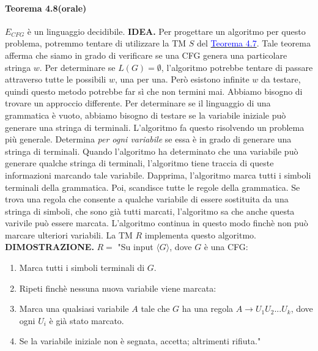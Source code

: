 \documentclass{article}
\begin{document}
\paragraph{Teorema 4.8(orale)}
\label{teorema-4.8}
$E_{CFG}$ è un linguaggio decidibile.
\vspace{1em}
\text{}
\newline
\hbox{\textbf{IDEA.}}
Per progettare un algoritmo per questo problema, potremmo tentare di utilizzare la TM $S$ del \hyperref[teorema-4.7]{\textcolor{blue}{Teorema 4.7}}.
Tale teorema afferma che siamo in grado di verificare se una CFG genera una particolare stringa $w$.
Per determinare se $L(G) = \emptyset$, l'algoritmo potrebbe tentare di passare attraverso tutte le possibili $w$, una per una.
Però esistono infinite $w$ da testare, quindi questo metodo potrebbe far sì che non termini mai.
Abbiamo bisogno di trovare un approccio differente. Per determinare se il linguaggio di una grammatica è vuoto, abbiamo bisogno di testare se la variabile iniziale può generare una stringa di terminali.
L'algoritmo fa questo risolvendo un problema più generale.
Determina \textit{per ogni variabile} se essa è in grado di generare una stringa di terminali.
Quando l'algoritmo ha determinato che una variabile può generare qualche stringa di terminali, l'algoritmo tiene traccia di queste informazioni marcando tale variabile.
Dapprima, l'algoritmo marca tutti i simboli terminali della grammatica.
Poi, scandisce tutte le regole della grammatica.
Se trova una regola che consente a qualche variabile di essere sostituita da una stringa di simboli, che sono già tutti marcati, l'algoritmo sa che anche questa varivile può essere marcata.
L'algoritmo continua in questo modo finchè non può marcare ulteriori variabili.
La TM $R$ implementa questo algoritmo.
\vspace{1em}
\text{}
\newline
\hbox{\textbf{DIMOSTRAZIONE.}}
\vspace{1em}
\text{}
\newline
$R = $ "Su input $\langle G \rangle$, dove $G$ è una CFG:
\begin{enumerate}
    \item Marca tutti i simboli terminali di $G$.
    \item Ripeti finchè nessuna nuova variabile viene marcata:
    \item Marca una qualsiasi variabile $A$ tale che $G$ ha una regola $A \rightarrow U_{1}U_{2}...U_{k}$, dove ogni $U_{i}$ è già stato marcato.
    \item Se la variabile iniziale non è segnata, accetta; altrimenti rifiuta."
\end{enumerate}
\end{document}
